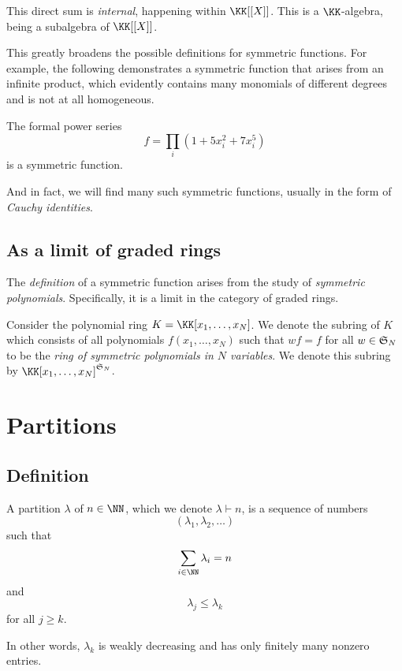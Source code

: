 \documentclass{article}
\newcommand{\frkS}{\ensuremath\mathfrak{S}}
\begin{document}
This direct sum is \textit{internal}, happening within $\KK[[X]]$. 
This is a $\KK$-algebra, being a subalgebra of $\KK[[X]]$.

This greatly broadens the possible definitions for symmetric functions. 
For example, the following demonstrates a symmetric function that arises from an infinite product, which evidently contains many monomials of different degrees and is not at all homogeneous.

\begin{example}
    The formal power series 
    \[
        f = \prod_i (1 + 5x_i^2 + 7x_i^5)
    \]
    is a symmetric function.
\end{example}

And in fact, we will find many such symmetric functions, usually in the form of \textit{Cauchy identities}.


\subsection{As a limit of graded rings}

The \textit{definition} of a symmetric function arises from the study of \textit{symmetric polynomials}. Specifically, it is a limit in the category of graded rings.

Consider the polynomial ring $K = \KK[x_1,\ldots,x_N]$. We denote the subring of $K$ which consists of all polynomials $f(x_1,\ldots,x_N)$ such that $wf = f$ for all $w \in \frkS_N$ to be the \textit{ring of symmetric polynomials in $N$ variables}.
We denote this subring by $\KK[x_1,\ldots,x_N]^{\frkS_N}$.


\section{Partitions}
\subsection{Definition}
\begin{definition}
    A partition $\lambda$ of $n \in \NN$, which we denote $\lambda \vdash n$, is a sequence of numbers 
    \[
        (\lambda_1,\lambda_2,\ldots)
    \]
    such that 
    \[
        \sum_{i\in\NN}\lambda_i = n
    \]
    and 
    \[
        \lambda_j \leq \lambda_k
    \]
    for all $j\geq k$.
\end{definition}

In other words, $\lambda_k$ is weakly decreasing and has only finitely many nonzero entries. 
\end{document}
